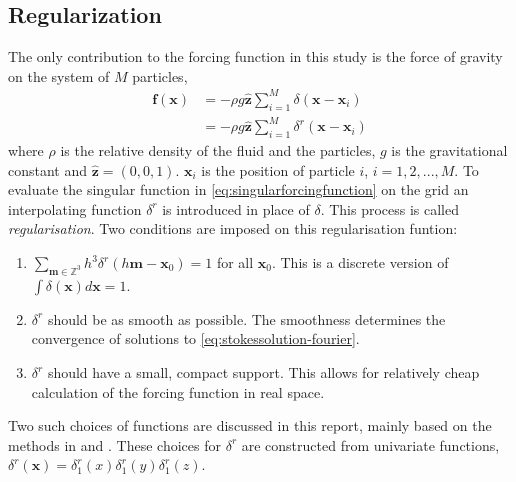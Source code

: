 \documentclass[a4paper,
twoside=false,abstract=false,numbers=noenddot,
titlepage=false,headings=small,parskip=half,version=last]{scrartcl}
\begin{document}
\subsection{Regularization\label{section:regularization}}
The only contribution to the forcing function in this study is the force of gravity on the system of $M$ particles,
\begin{align}
\mathbf{f}(\mathbf{x}) &= -\rho g\hat{\mathbf{z}}\sum_{i=1}^M \delta (\mathbf{x}-\mathbf{x}_i)\label{eq:singularforcingfunction}\\
&= -\rho g\hat{\mathbf{z}}\sum_{i=1}^M \delta^{r} (\mathbf{x}-\mathbf{x}_i)\nonumber
\end{align}
where $\rho$ is the relative density of the fluid and the particles, $g$ is the gravitational constant and $\hat{\mathbf{z}}=(0,0,1)$. $\mathbf{x}_i$ is the position of particle $i$, $i=1,2,...,M$.
To evaluate the singular function in \eqref{eq:singularforcingfunction} on the grid an interpolating function $\delta^{r}$ is introduced in place of $\delta$.
This process is called \emph{regularisation}.
Two conditions are imposed on this regularisation funtion:
\begin{enumerate}
\item $\sum_{\mathbf{m}\in \mathbb{Z}^3}h^3\delta^{r}(h\mathbf{m}-\mathbf{x}_0) = 1$ for all $\mathbf{x}_0$. This is a discrete version of $\int \delta(\mathbf{x}) d\mathbf{x}=1$.
\item $\delta^{r}$ should be as smooth as possible. The smoothness determines the convergence of solutions to \eqref{eq:stokessolution-fourier}.
\item $\delta^{r}$ should have a small, compact support. This allows for relatively cheap calculation of the forcing function in real space.
\end{enumerate}
Two such choices of functions are discussed in this report, mainly based on the methods in \cite{spectralewald} and \cite{interfaceregularization}.
These choices for $\delta^{r}$ are constructed from univariate functions, $\delta^{r}(\mathbf{x}) = \delta^{r}_{1}(x) \delta^{r}_{1}(y) \delta^{r}_{1}(z)$.

\end{document}
